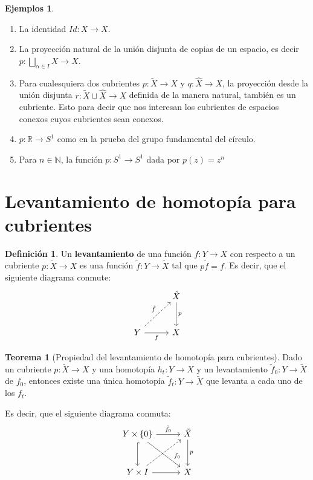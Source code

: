 \documentclass[spanish]{book}
\theoremstyle{definition}
\newtheorem*{defn}{Definición}
\newtheorem*{teo}{Teorema}
\newtheorem*{ejems}{Ejemplos}
\newcommand{\R}{\mathbb{R}}
\newcommand{\N}{\mathbb{N}}
\begin{document}
	\begin{ejems}\leavevmode
		\begin{enumerate}
			\item La identidad $Id:X\to X$.
			\item La proyección natural de la unión disjunta de copias de un espacio, es decir $p:\bigsqcup_{\alpha\in I}X\to X$.
			\item Para cualesquiera dos cubrientes $p:\tilde X\to X$ y $q:\hat X\to X$, la proyección desde la unión disjunta $r:\tilde{X}\sqcup\hat{X}\to X$ definida de la manera natural, también es un cubriente. Esto para decir que nos interesan los cubrientes de espacios conexos cuyos cubrientes sean conexos.
			\item $p:\R\to S^1$ como en la prueba del grupo fundamental del círculo.
			\item Para $n\in\N$, la función	$p:S^1\to S^1$ dada por $p(z)=z^n$
		\end{enumerate}
	\end{ejems}
\section{Levantamiento de homotopía para cubrientes}
\begin{defn}
	Un \textbf{levantamiento} de una función $f:Y\to X$ con respecto a un cubriente $p:\tilde{X}\to X$ es una función $\tilde{f}:Y\to\tilde{X}$ tal que $p\tilde{f}=f$. Es decir, que el siguiente diagrama conmute:
	\[\begin{tikzcd}[column sep=1cm,row sep=1cm]
		&\tilde{X}\arrow[d,"p"]\\
		Y\arrow[ur,dashed,"\tilde{f}"]\arrow[r,swap,"f"]&X
	\end{tikzcd}\]
	\begin{teo}[Propiedad del levantamiento de homotopía para cubrientes]\label{teo-lhc}
		Dado un cubriente $p:\tilde{X}\to X$ y una homotopía $h_t:Y\to X$ y un levantamiento $\tilde{f}_0:Y\to \tilde{X}$ de $f_0$, entonces existe una única homotopía $\tilde{f}_t:Y\to \tilde{X}$ que levanta a cada uno de los $f_t$.
		
		Es decir, que el siguiente diagrama conmuta:
		\[\begin{tikzcd}[column sep=1cm,row sep=1cm]
			Y\times\{0\}\arrow[r,"\tilde{f}_0"]\arrow[rd,"f_0" near end]\arrow[d,hook]&\tilde{X}\arrow[d,"p"]\\
			Y\times I\arrow[r]\arrow[ru,dashed]&X
		\end{tikzcd}\]
	\end{teo}
\end{defn}
\end{document}
